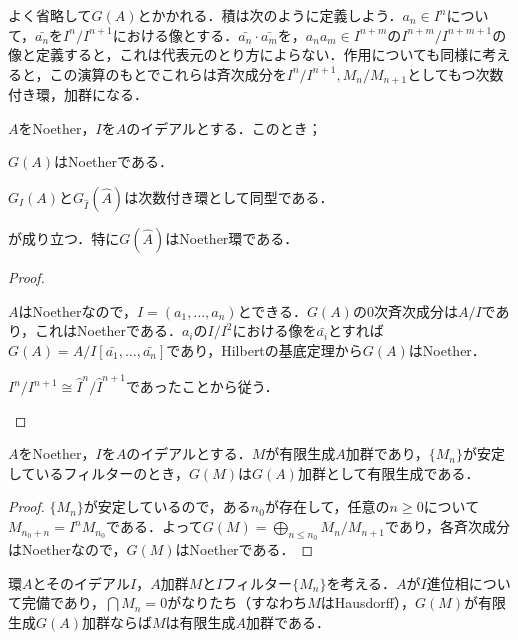 よく省略して$G(A)$とかかれる．積は次のように定義しよう．$a_n\in I^n$について，$\bar{a_n}$を$I^n/I^{n+1}$における像とする．$\bar{a_n}\cdot\bar{a_m}$を，$a_na_m\in I^{n+m}$の$I^{n+m}/I^{n+m+1}$の像と定義すると，これは代表元のとり方によらない．作用についても同様に考えると，この演算のもとでこれらは斉次成分を$I^n/I^{n+1},M_n/M_{n+1}$としてもつ次数付き環，加群になる．

\begin{prop}\label{prop:G(hat{A})はNoether}
	$A$をNoether，$I$を$A$のイデアルとする．このとき；
	\begin{sakura}
		\item $G(A)$はNoetherである．
		\item $G_I(A)$と$G_{\widehat{I}}(\widehat{A})$は次数付き環として同型である．
	\end{sakura}
	が成り立つ．特に$G(\widehat{A})$はNoether環である．
\end{prop}

\begin{proof}
	\begin{sakura}
		\item $A$はNoetherなので，$I=(a_1,\dots, a_n)$とできる．$G(A)$の$0$次斉次成分は$A/I$であり，これはNoetherである．$a_i$の$I/I^2$における像を$\bar{a_i}$とすれば$G(A)=A/I[\bar{a_1},\dots,\bar{a_n}]$であり，Hilbertの基底定理から$G(A)$はNoether．
		
		\item $I^n/I^{n+1}\cong\widehat{I}^n/\widehat{I}^{n+1}$であったことから従う．
	\end{sakura}
\end{proof}

\begin{prop}\label{prop:フィルターが安定していればG(M)は有限生成}
	$A$をNoether，$I$を$A$のイデアルとする．$M$が有限生成$A$加群であり，$\{M_n\}$が安定しているフィルターのとき，$G(M)$は$G(A)$加群として有限生成である．
\end{prop}

\begin{proof}
	$\{M_n\}$が安定しているので，ある$n_0$が存在して，任意の$n\geq0$について$M_{n_0+n}=I^nM_{n_0}$である．よって$G(M)=\bigoplus_{n\leq n_0}M_n/M_{n+1}$であり，各斉次成分はNoetherなので，$G(M)$はNoetherである．
\end{proof}

\begin{prop}\label{prop:完備な環上の加群の有限生成性}
	環$A$とそのイデアル$I$，$A$加群$M$と$I$フィルター$\{M_n\}$を考える．$A$が$I$進位相について完備であり，$\bigcap M_n=0$がなりたち（すなわち$M$はHausdorff），$G(M)$が有限生成$G(A)$加群ならば$M$は有限生成$A$加群である．
\end{prop}

